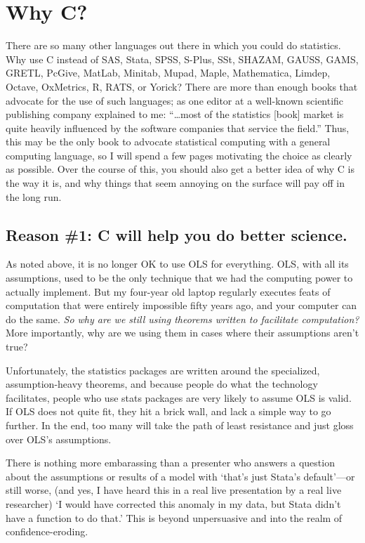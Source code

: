 \section{Why C?}

There are so many other languages out there in which you could do
statistics. Why use C instead of SAS, Stata, SPSS, S-Plus, SSt, SHAZAM, GAUSS, GAMS, GRETL,
PcGive, MatLab, Minitab, Mupad, Maple, Mathematica, Limdep, Octave, OxMetrics, R, RATS, or Yorick? 
There are more than enough books that advocate for the use of such
languages; 
as one editor at a well-known scientific publishing company
explained to me: ``\dots most of the statistics [book] market is quite heavily
influenced by the software companies that service the
field.''  Thus, this may be the only book to advocate statistical computing
with a general computing language, so I will spend a few pages motivating
the choice as clearly as possible. Over the course of this, you should
also get a better idea of why C is the way it is, and why things that
seem annoying on the surface will pay off in the long run.
\ifbook
\subsection{Reason \#1: C will help you do better science.}
As noted above, it is no longer OK to use OLS for everything.
OLS, with all its assumptions, used to be the only technique that we had the computing
power to actually implement. But my four-year old laptop regularly executes
feats of computation that were entirely impossible fifty years ago, and your
computer can do the same.  {\it So why are
we still using theorems written to facilitate computation?} More importantly, why
are we using them in cases where their assumptions aren't true?

Unfortunately, the statistics packages are written around the
specialized, assumption-heavy theorems, and because people do what the
technology facilitates, people who use stats packages are very
likely to assume OLS is valid.  If OLS does not quite fit, they hit a
brick wall, and lack a simple way to go further. In the end, too many
will take the path of least resistance and just gloss over OLS's assumptions.

There is nothing more embarassing than a presenter who answers a question
about the assumptions or results of a model with `that's just Stata's
default'---or still worse, (and yes, I have heard this in a real live
presentation by a real live researcher) `I would have corrected this
anomaly in my data, but Stata didn't have a function to do that.' This
is beyond unpersuasive and into the realm of confidence-eroding.

